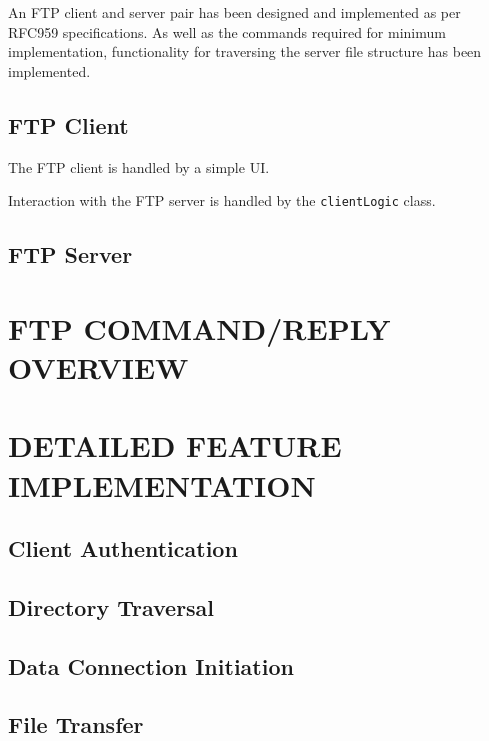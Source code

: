 \documentclass[10pt,twocolumn]{witseiepaper}
\begin{document}
An FTP client and server pair has been designed and implemented as per RFC959 specifications. As well as the commands required for minimum implementation, functionality for traversing the server file structure has been implemented. 

\subsection{FTP Client}

The FTP client is handled by a simple UI. %

Interaction with the FTP server is handled by the \texttt{clientLogic} class. 

\subsection{FTP Server}


\section{FTP COMMAND/REPLY OVERVIEW} %



\section{DETAILED FEATURE IMPLEMENTATION} %

\subsection{Client Authentication}

\subsection{Directory Traversal}

\subsection{Data Connection Initiation}

\subsection{File Transfer}
\end{document}
